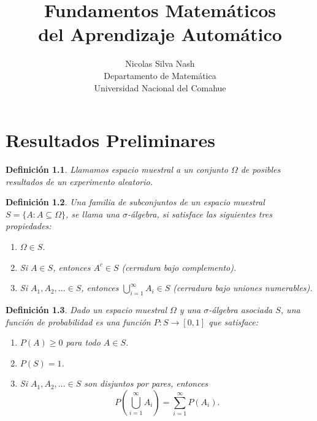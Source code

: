 \documentclass{report}
\newtheorem{dfn}{Definición}[section]
\begin{document}
\title{Fundamentos Matemáticos \\ del Aprendizaje Automático}
\author{Nicolas Silva Nash \\ Departamento de Matemática \\ Universidad Nacional del Comahue}
\maketitle
\tableofcontents
\chapter{Resultados Preliminares}


\begin{dfn}
    Llamamos \textit{espacio muestral} a un conjunto $\Omega$ de posibles resultados de un experimento aleatorio.
\end{dfn}
\begin{dfn}
Una familia de subconjuntos de un espacio muestral $S=\{A: A\subseteq\Omega\}$,  se llama una $\sigma$-\emph{álgebra}, si satisface las siguientes tres propiedades:

\begin{enumerate}
    \item \( \Omega \in S \).
    \item Si \( A \in S \), entonces \( A^c \in S \) (cerradura bajo complemento).
    \item Si \( A_1, A_2, \ldots \in S \), entonces \( \bigcup_{i=1}^\infty A_i \in S \) (cerradura bajo uniones numerables).
\end{enumerate}
\end{dfn}


\begin{dfn}
Dado un espacio muestral \( \Omega \) y una $\sigma$-álgebra asociada \( S \), 
una \emph{función de probabilidad} es una función \( P \colon S \to [0,1] \) que satisface:

\begin{enumerate}
    \item \( P(A) \geq 0 \) para todo \( A \in S \).
    \item \( P(S) = 1 \).
    \item Si \( A_1, A_2, \dots \in S \) son disjuntos por pares, entonces
    \[
        P\left( \bigcup_{i=1}^{\infty} A_i \right) = \sum_{i=1}^{\infty} P(A_i).
    \]
\end{enumerate}
\end{dfn}
\end{document}
